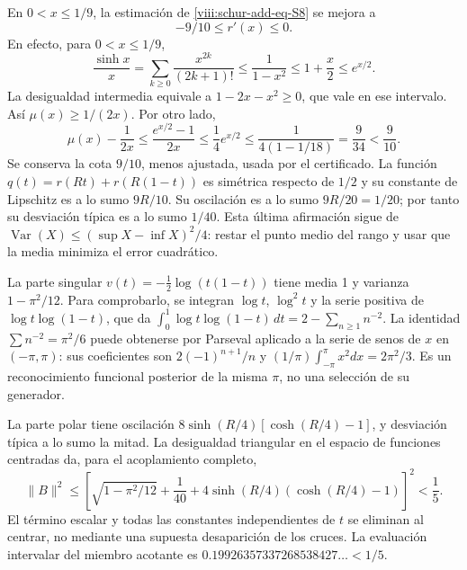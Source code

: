 En \(0<x\leq1/9\), la estimación de \eqref{viii:schur-add-eq-S8} se mejora a
\begin{equation}
-9/10\leq r'(x)\leq0.
\label{viii:schur-add-display-25}
\end{equation}
En efecto, para \(0<x\leq1/9\),
\begin{equation}
\frac{\sinh x}{x}
=\sum_{k\geq0}\frac{x^{2k}}{(2k+1)!}
\leq\frac1{1-x^2}\leq1+\frac x2\leq e^{x/2}.
\label{viii:schur-add-display-26}
\end{equation}
La desigualdad intermedia equivale a \(1-2x-x^2\geq0\),
que vale en ese intervalo. Así \(\mu(x)\geq1/(2x)\).
Por otro lado,
\begin{equation}
\mu(x)-\frac1{2x}\leq\frac{e^{x/2}-1}{2x}
\leq\frac14 e^{x/2}
\leq\frac1{4(1-1/18)}=\frac9{34}<\frac9{10}.
\label{viii:schur-add-display-27}
\end{equation}
Se conserva la cota \(9/10\), menos ajustada, usada por el certificado.
La función \(q(t)=r(Rt)+r(R(1-t))\) es simétrica respecto de
\(1/2\) y su constante de Lipschitz es a lo sumo \(9R/10\).
Su oscilación es a lo sumo \(9R/20=1/20\); por tanto su desviación
típica es a lo sumo \(1/40\). Esta última afirmación sigue de
\(\operatorname{Var}(X)\leq(\sup X-\inf X)^2/4\): restar el
punto medio del rango y usar que la media minimiza el error cuadrático.

La parte singular \(v(t)=-\tfrac12\log(t(1-t))\) tiene media 1 y
varianza \(1-\pi^2/12\). Para comprobarlo, se integran
\(\log t\), \(\log^2t\) y la serie positiva de
\(\log t\log(1-t)\), que da
\(\int_0^1\log t\log(1-t)\,dt=2-\sum_{n\geq1}n^{-2}\).
La identidad \(\sum n^{-2}=\pi^2/6\) puede obtenerse por Parseval
aplicado a la serie de senos de \(x\) en \((-\pi,\pi)\): sus
coeficientes son \(2(-1)^{n+1}/n\) y
\((1/\pi)\int_{-\pi}^{\pi}x^2dx=2\pi^2/3\). Es un reconocimiento
funcional posterior de la misma \(\pi\), no una selección de su generador.

La parte polar tiene oscilación
\(8\sinh(R/4)[\cosh(R/4)-1]\), y desviación típica a lo sumo
la mitad. La desigualdad triangular en el espacio de funciones
centradas da, para el acoplamiento completo,
\begin{equation}
\boxed{\|B\|^2\leq
\left[\sqrt{1-\pi^2/12}+\frac1{40}
+4\sinh(R/4)(\cosh(R/4)-1)\right]^2<\frac15.}
\label{viii:schur-add-eq-S12}
\end{equation}
El término escalar y todas las constantes independientes de \(t\)
se eliminan al centrar, no mediante una supuesta desaparición de los
cruces. La evaluación intervalar del miembro acotante es
\(0.19926357337268538427\ldots<1/5\).


